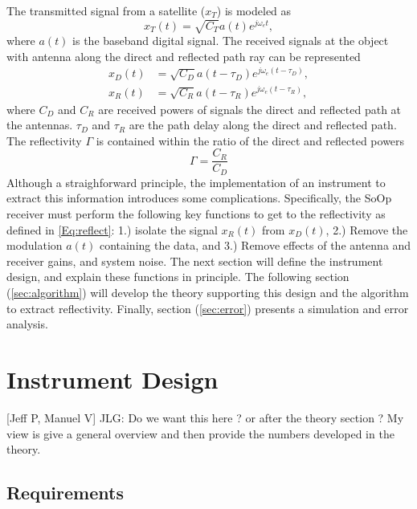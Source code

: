 \documentclass[draftcls,onecolumn]{IEEEtran}  %
\begin{document}
The transmitted signal from a satellite ($x_{T}$) is modeled as
\begin{equation}
	x_T(t)=\sqrt{C_T}a(t)e^{j\omega_et},
    \label{Eq:xT}
\end{equation}
where $a(t)$ is the baseband digital signal.  The received signals at the object with antenna along the direct and reflected path ray can be represented 
\begin{eqnarray}
  	x_D(t)&=\sqrt{C_D}a(t-\tau_D)e^{j\omega_e(t-\tau_D)}, \\
    x_R(t)&=\sqrt{C_R}a(t-\tau_R)e^{j\omega_e(t-\tau_R)}, 
    \label{Eq:xD_xR}
\end{eqnarray}
where $C_D$ and $C_R$ are received powers of signals the direct and reflected path at the antennas.  
$\tau_D$ and $\tau_R$ are the path delay along the direct and reflected path. The reflectivity $\Gamma$ is contained within the ratio of the direct and reflected powers
\begin{equation}
	\Gamma=\frac{C_{R}}{C_{D}}
    \label{Eq:reflect}
\end{equation}
Although a straighforward principle, the implementation of an instrument to extract this information introduces some complications.  
Specifically, the SoOp receiver must perform the following key functions to get to the reflectivity as defined in \ref{Eq:reflect}: 1.) isolate the signal $x_R(t)$ from $x_D(t)$, 2.) Remove the modulation $a(t)$ containing the data, and 3.) Remove effects of the antenna and receiver gains, and system noise.  
The next section will define the instrument design, and explain these functions in principle.  
The following section (\ref{sec:algorithm}) will develop the theory supporting this design and the algorithm to extract reflectivity. 
Finally, section (\ref{sec:error}) presents a simulation and error analysis. 


\section{Instrument Design}

[Jeff P, Manuel V]
\label{sec:instrument}
JLG: Do we want this here ? or after the theory section ? My view is give a general overview and then provide the numbers developed in the theory. 

\subsection{Requirements}
\end{document}
